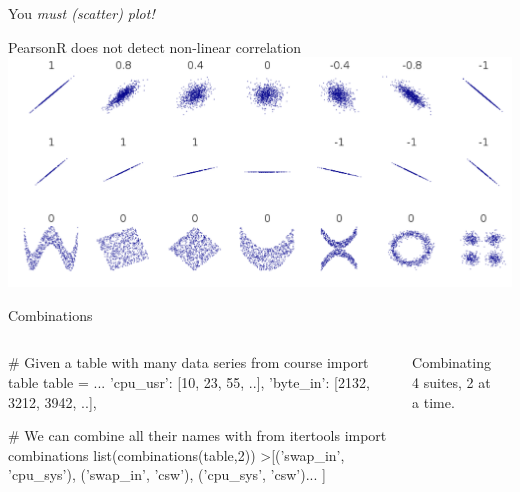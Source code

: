 \begin{pyframe}{You \emph{must (scatter) plot!}}
\LARGE
\begin{center}
PearsonR does not detect non-linear correlation \\
\includegraphics[width=.8\textwidth]{correlation.pdf} \\
\end{center}
\end{pyframe}


\begin{pyframe}{Combinations } %
\begin{columns}
\begin{pycode}
# Given a table with many data series
from course import table
table = {...
  'cpu_usr': [10, 23, 55, ..],
  'byte_in': [2132, 3212, 3942, ..], }

# We can combine all their names with
from itertools import combinations
list(combinations(table,2))
>[('swap_in', 'cpu_sys'),
 ('swap_in', 'csw'),  ('cpu_sys', 'csw')... ]








\end{pycode}
Combinating 4 suites, 2 at a time.\\
\begin{center}
\\
\hearts \spades \\
\hearts \clubs \\
\hearts \diamonds \\
\spades \clubs \\
\spades \diamonds \\
\clubs \diamonds \\
\end{center}
\end{columns}
\end{pyframe}


